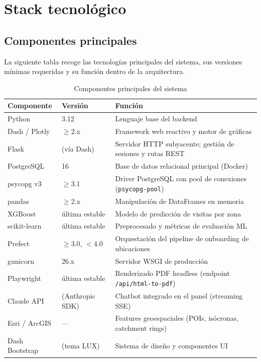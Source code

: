 \documentclass[12pt, a4paper]{article}
\begin{document}
\section{Stack tecnológico}

 \subsection{Componentes principales}

  La siguiente tabla recoge las tecnologías principales del sistema, sus versiones
  mínimas requeridas y su función dentro de la arquitectura.

  \begin{table}[H]
  \centering
  \renewcommand{\arraystretch}{1.3}
  \begin{tabular}{llp{6.5cm}}
  \toprule
  \textbf{Componente} & \textbf{Versión} & \textbf{Función} \\
  \midrule
  Python          & 3.12              & Lenguaje base del backend \\
  Dash / Plotly   & $\geq$2.x         & Framework web reactivo y motor de gráficas \\
  Flask           & (vía Dash)        & Servidor HTTP subyacente; gestión de sesiones y rutas REST \\
  PostgreSQL      & 16                & Base de datos relacional principal (Docker) \\
  psycopg v3      & $\geq$3.1         & Driver PostgreSQL con pool de conexiones (\texttt{psycopg-pool}) \\
  pandas          & $\geq$2.x         & Manipulación de DataFrames en memoria \\
  XGBoost         & última estable    & Modelo de predicción de visitas por zona \\
  scikit-learn    & última estable    & Preprocesado y métricas de evaluación ML \\
  Prefect         & $\geq$3.0, $<$4.0 & Orquestación del pipeline de onboarding de ubicaciones \\
  gunicorn        & 26.x              & Servidor WSGI de producción \\
  Playwright      & última estable    & Renderizado PDF headless (endpoint \texttt{/api/html-to-pdf}) \\
  Claude API      & (Anthropic SDK)   & Chatbot integrado en el panel (streaming SSE) \\
  Esri / ArcGIS   & —                 & Features geoespaciales (POIs, isócronas, catchment rings) \\
  Dash Bootstrap  & (tema LUX)        & Sistema de diseño y componentes UI \\
  \bottomrule
  \end{tabular}
  \caption{Componentes principales del sistema}
  \label{tab:stack}
  \end{table}
\end{document}
